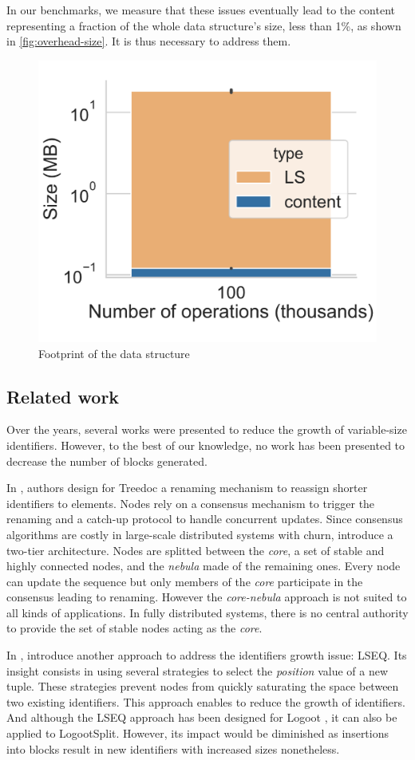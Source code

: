\documentclass[sigplan,10pt]{acmart}
\begin{document}
In our benchmarks, we measure that these issues eventually lead to the content representing a fraction of the whole data structure's size, less than 1\%, as shown in \autoref{fig:overhead-size}. It is thus necessary to address them.

\begin{figure}[ht!]
    \centering
    \includegraphics[width=0.55\columnwidth]{img/overhead-size.pdf}
    \caption{Footprint of the data structure}
    \label{fig:overhead-size}
\end{figure}

\subsection{Related work}

Over the years, several works were presented to reduce the growth of variable-size identifiers.
However, to the best of our knowledge, no work has been presented to decrease the number of blocks generated.

In \cite{letia:hal-01248270,zawirski:hal-01248197}, authors design for Treedoc \cite{5158449} a renaming mechanism to reassign shorter identifiers to elements.
Nodes rely on a consensus mechanism to trigger the renaming and a catch-up protocol to handle concurrent updates.
Since consensus algorithms are costly in large-scale distributed systems with churn, \citet{letia:hal-01248270} introduce a two-tier architecture.
Nodes are splitted between the \emph{core}, a set of stable and highly connected nodes, and the \emph{nebula} made of the remaining ones.
Every node can update the sequence but only members of the \emph{core} participate in the consensus leading to renaming.
However the \emph{core-nebula} approach is not suited to all kinds of applications.
In fully distributed systems, there is no central authority to provide the set of stable nodes acting as the \emph{core}.

In \cite{nedelec_2013_lseq,doi:10.1002/cpe.4108}, \citeauthor{nedelec_2013_lseq} introduce another approach to address the identifiers growth issue: LSEQ.
Its insight consists in using several strategies to select the \emph{position} value of a new tuple.
These strategies prevent nodes from quickly saturating the space between two existing identifiers.
This approach enables to reduce the growth of identifiers.
And although the LSEQ approach has been designed for Logoot \cite{WeissICDCS09}, it can also be applied to LogootSplit.
However, its impact would be diminished as insertions into blocks result in new identifiers with increased sizes nonetheless.
\end{document}
